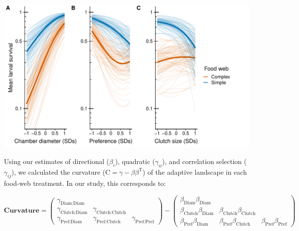 \documentclass[11pt,]{article}
\let\origfigure\figure
\let\endorigfigure\endfigure
\renewenvironment{figure}[1][2] {
    \expandafter\origfigure\expandafter[H]
} {
    \endorigfigure
}
\begin{document}
\begin{figure}
\centering
\includegraphics{analyses/UV_landscapes.pdf}
\caption{\label{fig:UV_Landscape}Adaptive landscape of gall midge
phenotypes in the original food web and with the extinction of larval
parasitoids. Each panel corresponds to a different phenotypic trait:
chamber diameter (A); oviposition preference (B); and clutch size (C).
Bold lines represent selection experienced in the original food web
(orange) and with consumer extinctions (blue). Thin lines represent
bootstrapped replicates to show the uncertainty in selection. For
clarity, we only display 100 bootstraps even though inferences are based
on 1,000 replicates. Note that mean larval survival is plotted on a
natural log scale to reflect the mathematical defintion of the adaptive
landscape.}
\end{figure}

Using our estimates of directional (\(\beta_i\)), quadratic
(\(\gamma_{ii}\)), and correlation selection (\(\gamma_{ij}\)), we
calculated the curvature (\(\text{C}=\gamma - \beta \beta^\text{T}\)) of
the adaptive landscape in each food-web treatment. In our study, this
corresponds to:

\[\textbf{Curvature} = \begin{pmatrix} \gamma_{\text{Diam:Diam}}&& \\ \gamma_{\text{Clutch:Diam}}&\gamma_{\text{Clutch:Clutch}}& \\ \gamma_{\text{Pref:Diam}} & \gamma_{\text{Pref:Clutch}} &\gamma_{\text{Pref:Pref}} \end{pmatrix} - \begin{pmatrix} \beta_{\text{Diam}}\beta_{\text{Diam}}&& \\ \beta_{\text{Clutch}}\beta_{\text{Diam}}&\beta_{\text{Clutch}}\beta_{\text{Clutch}}& \\ \beta_{\text{Pref}}\beta_{\text{Diam}} & \beta_{\text{Pref}}\beta_{\text{Clutch}} &\beta_{\text{Pref}}\beta_{\text{Pref}} \end{pmatrix}\]
\end{document}
